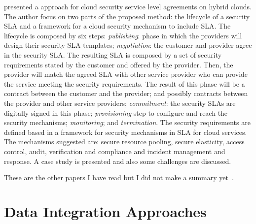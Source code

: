 \documentclass[12pt,a4paper,oneside]{book}
\begin{document}
\bigskip
\cite{011} presented a approach for cloud security service level agreements on hybrid clouds. The author focus on two parts of the proposed method: the lifecycle of a security SLA and a framework for a cloud security mechanism to include SLA. The lifecycle is composed by six steps: \textit{publishing}: phase in which the providers will design their security SLA templates; \textit{negotiation}: the customer and provider agree in the security SLA. The resulting SLA is composed by a set of security requirements stated by the customer and offered by the provider. Then, the provider will match the agreed SLA with other service provider who can provide the service meeting the security requirements. The result of this phase will be a contract between the customer and the provider; and possibly contracts between the provider and other service providers; \textit{commitment}: the security SLAs are digitally signed in this phase; \textit{provisioning} step to configure and reach the security mechanisms; \textit{monitoring}; and \textit{termination}. The security requirements are defined based in a framework for security mechanisms in SLA for cloud services. The mechanisms suggested are: secure resource pooling, secure elasticity, access control, audit, verification and compliance and incident management and response. A case study is presented and also some challenges are discussed.

\bigskip These are the other papers I have read but I did not make a summary yet~\cite{BernsmedJU11,025}.

\section{Data Integration Approaches}

\cite{070,066,094,102,Lenzerini:2002,110,096,081,072,Nie07,078,075,067,077,111,Dustdar:2012,Gonzalez:2010,Gonzalez:2010b,099,113}



\end{document}
